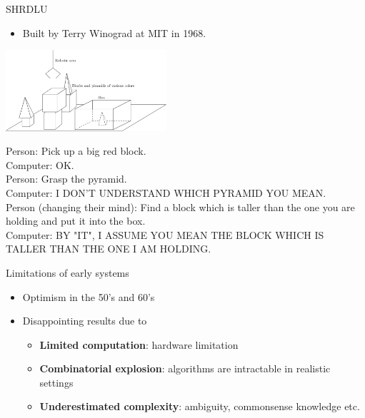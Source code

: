 \documentclass[usenames,dvipsnames,notes]{beamer}
\begin{document}
\begin{frame}
    {SHRDLU}
    \begin{itemize}
        \item Built by Terry Winograd at MIT in 1968.
    \end{itemize}
    \begin{center}
    \includegraphics[height=3cm]{figures/shrdlu}
    \end{center}
    \begin{simpleblock}{}
        Person: Pick up a big red block.\\
Computer: OK.\\
Person: Grasp the pyramid.\\
Computer: I DON'T UNDERSTAND WHICH PYRAMID YOU MEAN.\\
Person (changing their mind): Find a block which is taller than the one you are holding and put it into the box.\\
Computer: BY "IT", I ASSUME YOU MEAN THE BLOCK WHICH IS TALLER THAN THE ONE I AM HOLDING.
    \end{simpleblock}
\end{frame}

\begin{frame}
    {Limitations of early systems}
    \begin{itemize}
        \itemsep1em
        \item Optimism in the 50's and 60's\\
        \item Disappointing results due to
            \begin{itemize}
                \item \textbf{Limited computation}: hardware limitation 
                \item \textbf{Combinatorial explosion}: algorithms are intractable in realistic settings
                \item \textbf{Underestimated complexity}: ambiguity, commonsense knowledge etc.
            \end{itemize}
    \end{itemize}
\end{frame}
\end{document}
